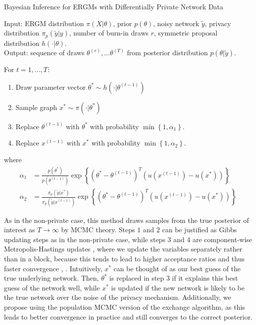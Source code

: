 \begin{algorithm}[!ht]
	\caption{Bayesian Inference for ERGMs with Differentially Private Network Data}
	Input: ERGM distribution $\pi(X | \theta)$, prior $p(\theta)$, noisy network $\tilde{y}$, privacy distribution $\pi_p(\tilde{y} | y)$, number of burn-in draws $r$, symmetric proposal distribution $h(\cdot | \theta)$. \\
	Output: sequence of draws $\theta^{(r)},...\theta^{(T)}$ from posterior distribution $p(\theta | \tilde{y})$.
	
	\vspace{0.1in}
	For {$ t = 1,...,T$}:
	\begin{enumerate}
		\item  Draw parameter vector $\theta^* \sim h(\cdot | \theta^{(t-1)})$
		\item Sample graph $x^* \sim \pi(\cdot | \theta^*)$
		\item Replace $\theta^{(t-1)}$ with $\theta^*$ with probability $\min\left\{1, \alpha_1\right\}$.
		\item Replace $x^{(t-1)}$ with $x^*$ with probability $\min\left\{1, \alpha_2\right\}$.
	\end{enumerate}
	where \begin{align*}
	\alpha_1 &= \frac{p(\theta^*)}{p(\theta^{(t-1)})} \exp\left\{\left(\theta^* - \theta^{(t-1)}\right)^T\left(u(x^{(t-1)}) - u(x^*)\right) \right\} \\
	\alpha_2 & = \frac{\pi_p(\tilde{y} | x^*) }{\pi_p(\tilde{y} | x^{(t-1)})} \exp\left\{\left(\theta^* - \theta^{(t-1)}\right)^T\left(u(x^{(t-1)}) - u(x^*)\right) \right\} 
	\end{align*}
\end{algorithm}

As in the non-private case, this method draws samples from the true posterior of interest as $T \to \infty$ by MCMC theory. Steps $1$ and $2$ can be justified as Gibbs updating steps as in the non-private case, while steps $3$ and $4$ are component-wise Metropolis-Hastings updates , where we update the variables separately rather than in a block, because this tends to lead to higher acceptance ratios and thus faster convergence \cite{GL06}, \cite{LM14}. Intuitively, $x^*$ can be thought of as our best guess of the true underlying network. Then, $\theta^*$ is replaced in step $3$ if it explains this best guess of the network well, while $x^*$ is updated if the new network is likely to be the true network over the noise of the privacy mechanism. Additionally, we propose using the population MCMC version of the exchange algorithm, as this leads to better convergence in practice and still converges to the correct posterior.


